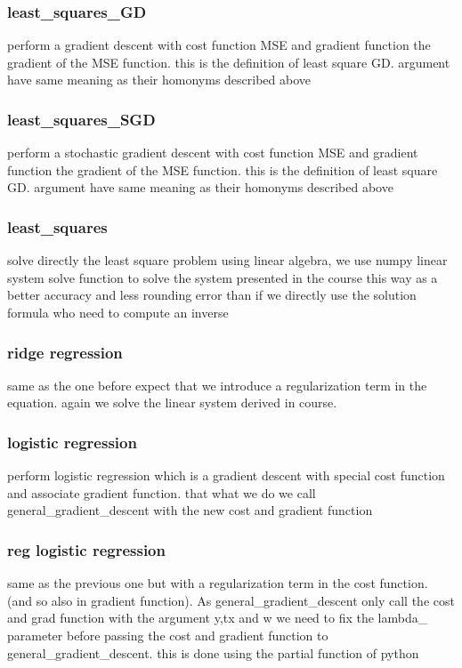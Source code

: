 \documentclass[10pt,conference,compsocconf]{IEEEtran}
\begin{document}
\subsubsection{least\_squares\_GD}
perform a gradient descent with cost function MSE and gradient function the gradient of the MSE function. this is the definition of least square GD. argument have same meaning as their homonyms described above

\subsubsection{least\_squares\_SGD}
perform a stochastic gradient descent with cost function MSE and gradient function the gradient of the MSE function. this is the definition of least square GD. argument have same meaning as their homonyms described above

\subsubsection{least\_squares}
solve directly the least square problem using linear algebra, we use numpy linear system solve function to solve the system presented in the course this way as a better accuracy and less rounding error than if we directly use the solution formula who need to compute an inverse

\subsubsection{ridge regression}

same as the one before expect that we introduce a regularization term in the equation. again we solve the linear system derived in course.

\subsubsection{logistic regression}

perform logistic regression which is a gradient descent with special cost function and associate gradient function. that what we do we call general\_gradient\_descent with the new cost and gradient function 

\subsubsection{reg logistic regression}
same as the previous one but with a regularization term in the cost function. (and so also in gradient function). As general\_gradient\_descent only call the cost and grad function with the argument y,tx and w we need to fix the lambda\_ parameter before passing the cost and gradient function to general\_gradient\_descent. this is done using the partial function of python
\end{document}

